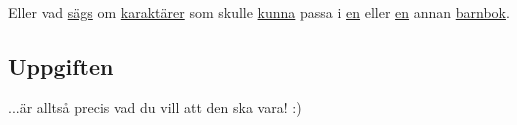 \documentclass{article}
\begin{document}
    \paragraph{}
    Eller vad
    \href{http://www.pinterest.com/pin/73324300155256876/}{sägs}
    om
    \href{http://www.pinterest.com/pin/223913412694866947/}{karaktärer}
    som skulle
    \href{http://www.pinterest.com/pin/219339444322006574/}{kunna}
    passa i
    \href{http://www.pinterest.com/pin/73324300156309389/}{en}
    eller
    \href{http://www.pinterest.com/pin/73324300156309421/}{en}
    annan
    \href{http://www.pinterest.com/pin/480970435175337969/}{barnbok}.

    \subsection*{ Uppgiften }
      ...är alltså precis vad du vill att den ska vara! :)
\end{document}
